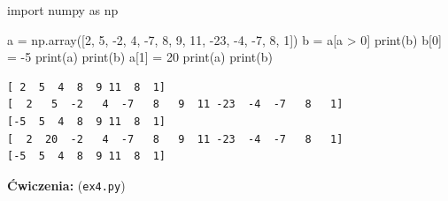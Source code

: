 \documentclass[
  polish,
  letterpaper,
  DIV=11,
  numbers=noendperiod]{scrreprt}
\newenvironment{Shaded}{\begin{snugshade}}{\end{snugshade}}
\newcommand{\BuiltInTok}[1]{\textcolor[rgb]{0.00,0.23,0.31}{#1}}
\newcommand{\DecValTok}[1]{\textcolor[rgb]{0.68,0.00,0.00}{#1}}
\newcommand{\ImportTok}[1]{\textcolor[rgb]{0.00,0.46,0.62}{#1}}
\newcommand{\NormalTok}[1]{\textcolor[rgb]{0.00,0.23,0.31}{#1}}
\newcommand{\OperatorTok}[1]{\textcolor[rgb]{0.37,0.37,0.37}{#1}}
\begin{document}
\begin{Shaded}
\begin{Highlighting}[]
\ImportTok{import}\NormalTok{ numpy }\ImportTok{as}\NormalTok{ np}

\NormalTok{a }\OperatorTok{=}\NormalTok{ np.array([}\DecValTok{2}\NormalTok{, }\DecValTok{5}\NormalTok{, }\OperatorTok{{-}}\DecValTok{2}\NormalTok{, }\DecValTok{4}\NormalTok{, }\OperatorTok{{-}}\DecValTok{7}\NormalTok{, }\DecValTok{8}\NormalTok{, }\DecValTok{9}\NormalTok{, }\DecValTok{11}\NormalTok{, }\OperatorTok{{-}}\DecValTok{23}\NormalTok{, }\OperatorTok{{-}}\DecValTok{4}\NormalTok{, }\OperatorTok{{-}}\DecValTok{7}\NormalTok{, }\DecValTok{8}\NormalTok{, }\DecValTok{1}\NormalTok{])}
\NormalTok{b }\OperatorTok{=}\NormalTok{ a[a }\OperatorTok{\textgreater{}} \DecValTok{0}\NormalTok{]}
\BuiltInTok{print}\NormalTok{(b)}
\NormalTok{b[}\DecValTok{0}\NormalTok{] }\OperatorTok{=} \OperatorTok{{-}}\DecValTok{5}
\BuiltInTok{print}\NormalTok{(a)}
\BuiltInTok{print}\NormalTok{(b)}
\NormalTok{a[}\DecValTok{1}\NormalTok{] }\OperatorTok{=} \DecValTok{20}
\BuiltInTok{print}\NormalTok{(a)}
\BuiltInTok{print}\NormalTok{(b)}
\end{Highlighting}
\end{Shaded}

\begin{verbatim}
[ 2  5  4  8  9 11  8  1]
[  2   5  -2   4  -7   8   9  11 -23  -4  -7   8   1]
[-5  5  4  8  9 11  8  1]
[  2  20  -2   4  -7   8   9  11 -23  -4  -7   8   1]
[-5  5  4  8  9 11  8  1]
\end{verbatim}

\textbf{Ćwiczenia:} (\texttt{ex4.py})
\end{document}

